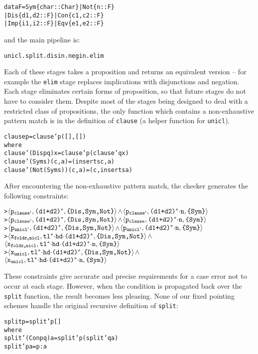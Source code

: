 \documentclass[book]{tfp05symp}
\newcommand{\T}[1]{\texttt{#1}}
\newcommand{\tup}[1]{\ensuremath{\langle #1 \rangle}}
\renewcommand{\c}[3]{\tup{\T{#1},\T{#2},\T{\{#3\}}}}
\newcommand{\s}[1]{\ensuremath{_{\tt #1}}}
\newcommand{\K}{\ensuremath{^\ast}}
\newcommand{\D}{\ensuremath{\cdot}}
\newenvironment{code}{\begin{alltt}\small}{\end{alltt}}
\begin{document}
\begin{code}
data F = Sym \{char :: Char\} | Not \{n :: F\}
       | Dis \{d1, d2 :: F\} | Con \{c1, c2 :: F\}
       | Imp \{i1, i2 :: F\} | Eqv \{e1, e2 :: F\}
\end{code}

\noindent and the main pipeline is:

\begin{code}
unicl . split . disin . negin . elim
\end{code}

Each of these stages takes a proposition and returns an equivalent
version -- for example the \T{elim} stage replaces implications with
disjunctions and negation. Each stage eliminates certain forms of
proposition, so that future stages do not have to consider them.
Despite most of the stages being designed to deal with a restricted
class of propositions, the only function which contains a
non-exhaustive pattern match is in the definition of \T{clause} (a
helper function for \T{unicl}).

\begin{code}
clause p = clause' p ([] , [])
    where
    clause' (Dis p q)       x   = clause' p (clause' q x)
    clause' (Sym s)       (c,a) = (insert s c , a)
    clause' (Not (Sym s)) (c,a) = (c , insert s a)
\end{code}

After encountering the non-exhaustive pattern match, the checker
generates the following constraints:

\begin{code}
> \c{p\s{clause'}}{(d1+d2)\K}{Dis,Sym,Not} \(\wedge\) \c{p\s{clause'}}{(d1+d2)\K\D{}n}{Sym}
> \c{p\s{clause'}}{(d1+d2)\K}{Dis,Sym,Not} \(\wedge\) \c{p\s{clause}}{(d1+d2)\K\D{}n}{Sym}
> \c{p\s{unicl'}}{(d1+d2)\K}{Dis,Sym,Not} \(\wedge\) \c{p\s{unicl'}}{(d1+d2)\K\D{}n}{Sym}
> \c{x\s{foldr_unicl}}{tl\K\D{}hd\D(d1+d2)\K}{Dis,Sym,Not} \(\wedge\)
  \c{x\s{foldr_unicl}}{tl\K\D{}hd\D(d1+d2)\K\D{}n}{Sym}
> \c{x\s{unicl}}{tl\K\D{}hd\D(d1+d2)\K}{Dis,Sym,Not} \(\wedge\)
  \c{x\s{unicl}}{tl\K\D{}hd\D(d1+d2)\K\D{}n}{Sym}
\end{code}

These constraints give accurate and precise requirements for a case
error not to occur at each stage. However, when the condition is
propagated back over the \T{split} function, the result becomes less
pleasing. None of our fixed pointing schemes handle the original
recursive definition of \T{split}:

\begin{code}
split p = split' p []
    where
    split' (Con p q) a = split' p (split' q a)
    split' p a = p : a
\end{code}
\end{document}
